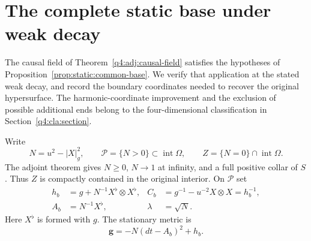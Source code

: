 \section{The complete static base under weak decay}\label{q4:sta:section}

The causal field of Theorem~\ref{q4:adj:causal-field} satisfies the
hypotheses of Proposition~\ref{prop:static:common-base}. We verify that
application at the stated weak decay, and record the boundary coordinates
needed to recover the original hypersurface. The harmonic-coordinate
improvement and the exclusion of possible additional ends belong to the
four-dimensional classification in Section~\ref{q4:cla:section}.

Write
\[
 N=u^2-|X|_g^2,\qquad
 \mathcal P=\{N>0\}\subset\operatorname{int}\Omega,\qquad
 Z=\{N=0\}\cap\operatorname{int}\Omega.
\]
The adjoint theorem gives $N\ge0$, $N\to1$ at infinity, and a full positive
collar of $S$. Thus $Z$ is compactly contained in the original interior.
On $\mathcal P$ set
\begin{equation}\label{q4:sta:base-variables}
 \begin{aligned}
 h_b&=g+N^{-1}X^\flat\otimes X^\flat,
 &C_b&=g^{-1}-u^{-2}X\otimes X=h_b^{-1},\\
 A_b&=N^{-1}X^\flat,
 &\lambda&=\sqrt N.
 \end{aligned}
\end{equation}
Here $X^\flat$ is formed with $g$. The stationary metric is
\begin{equation}\label{q4:sta:stationary-decomposition}
 \mathbf g=-N(dt-A_b)^2+h_b.
\end{equation}


